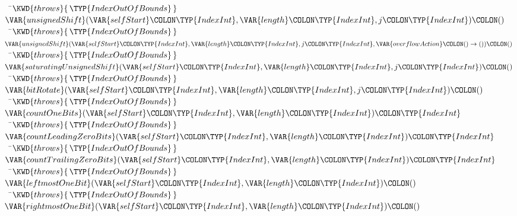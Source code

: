 \begin{Fortress}
{\tt~~}\pushtabs\=\+\(    \KWD{throws} \{\,\TYP{IndexOutOfBounds}\,\}\)\-\\\poptabs
\(  \VAR{unsignedShift}(\VAR{selfStart}\COLON \TYP{IndexInt}, \VAR{length}\COLON \TYP{IndexInt}, j\COLON \TYP{IndexInt})\COLON ()\)\\
{\tt~~}\pushtabs\=\+\(    \KWD{throws} \{\,\TYP{IndexOutOfBounds}\,\}\)\-\\\poptabs
\(  \VAR{unsignedShift}(\VAR{selfStart}\COLON \TYP{IndexInt}, \VAR{length}\COLON \TYP{IndexInt}, j\COLON \TYP{IndexInt}, \VAR{overflowAction}\COLON ()\rightarrow())\COLON ()\)\\
{\tt~~}\pushtabs\=\+\(    \KWD{throws} \{\,\TYP{IndexOutOfBounds}\,\}\)\-\\\poptabs
\(  \VAR{saturatingUnsignedShift}(\VAR{selfStart}\COLON \TYP{IndexInt}, \VAR{length}\COLON \TYP{IndexInt}, j\COLON \TYP{IndexInt})\COLON ()\)\\
{\tt~~}\pushtabs\=\+\(    \KWD{throws} \{\,\TYP{IndexOutOfBounds}\,\}\)\-\\\poptabs
\(  \VAR{bitRotate}(\VAR{selfStart}\COLON \TYP{IndexInt}, \VAR{length}\COLON \TYP{IndexInt}, j\COLON \TYP{IndexInt})\COLON ()\)\\
{\tt~~}\pushtabs\=\+\(    \KWD{throws} \{\,\TYP{IndexOutOfBounds}\,\}\)\-\\\poptabs
\(  \VAR{countOneBits}(\VAR{selfStart}\COLON \TYP{IndexInt}, \VAR{length}\COLON \TYP{IndexInt})\COLON \TYP{IndexInt}\)\\
{\tt~~}\pushtabs\=\+\(    \KWD{throws} \{\,\TYP{IndexOutOfBounds}\,\}\)\-\\\poptabs
\(  \VAR{countLeadingZeroBits}(\VAR{selfStart}\COLON \TYP{IndexInt}, \VAR{length}\COLON \TYP{IndexInt})\COLON \TYP{IndexInt}\)\\
{\tt~~}\pushtabs\=\+\(    \KWD{throws} \{\,\TYP{IndexOutOfBounds}\,\}\)\-\\\poptabs
\(  \VAR{countTrailingZeroBits}(\VAR{selfStart}\COLON \TYP{IndexInt}, \VAR{length}\COLON \TYP{IndexInt})\COLON \TYP{IndexInt}\)\\
{\tt~~}\pushtabs\=\+\(    \KWD{throws} \{\,\TYP{IndexOutOfBounds}\,\}\)\-\\\poptabs
\(  \VAR{leftmostOneBit}(\VAR{selfStart}\COLON \TYP{IndexInt}, \VAR{length}\COLON \TYP{IndexInt})\COLON ()\)\\
{\tt~~}\pushtabs\=\+\(    \KWD{throws} \{\,\TYP{IndexOutOfBounds}\,\}\)\-\\\poptabs
\(  \VAR{rightmostOneBit}(\VAR{selfStart}\COLON \TYP{IndexInt}, \VAR{length}\COLON \TYP{IndexInt})\COLON ()\)\\

\end{Fortress}
